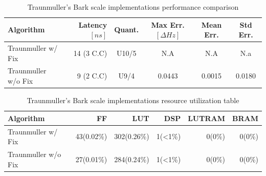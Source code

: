 \begin{table}[H]
    \hspace*{-1.8cm}
\begin{tabular}{ !{\color{mtblborder}\vrule}l!{\color{mtblborder}\vrule}rcccc| } 
    \hline

    \hline
     \color{white}\bf{Algorithm} 
    & \color{white}\bf{Latency \([ns]\)}  
    & \color{white}\bf{Quant.} 
    & \color{white}\bf{Max Err. \([\Delta Hz]\)}
    & \color{white}\bf{Mean Err.}
    & \color{white}\bf{Std Err.} \\
    \hline

    \hline
     Traunmuller w/ Fix   & 14 (3 C.C) & U10/5 & N.A & N.A & N.a \\
    \hline
    
    \hline
     Traunmuller w/o Fix  & 9 (2 C.C) &  U9/4  & 0.0443 & 0.0015 & 0.0180 \\
    \hline

    \hline
\end{tabular}
\caption{Traunmuller's Bark scale implementations performance comparison}
\label{tbl:bark_implementations_performance}
\end{table}


\begin{table}[H]
    \centering
\begin{tabular}{ !{\color{ytblborder}\vrule}l!{\color{ytblborder}\vrule}rrrrr| } 
    \hline

    \hline
     \color{white}\bf{Algorithm} 
    & \color{white}\bf{FF} 
    & \color{white}\bf{LUT} 
    & \color{white}\bf{DSP} 
    & \color{white}\bf{LUTRAM} 
    & \color{white}\bf{BRAM} \\
    \hline

    \hline
     Traunmuller w/ Fix   & 43(0.02\%) & 302(0.26\%) & 1(<1\%) & 0(0\%) & 0(0\%)  \\
    \hline
    
    \hline
     Traunmuller w/o Fix      & 27(0.01\%) & 284(0.24\%) & 1(<1\%) & 0(0\%)  & 0(0\%)    \\
    \hline

    \hline
\end{tabular}
\caption{Traunmuller's Bark scale implementations resource utilization table}
\label{tbl:Bark_resource_util}
\end{table}


